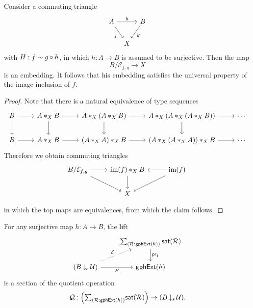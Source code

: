 \begin{thm}
Consider a commuting triangle
\begin{equation*}
\begin{tikzcd}[column sep=tiny]
A \arrow[rr,"h"] \arrow[dr,swap,"f"] & & B \arrow[dl,"g"] \\
& X
\end{tikzcd}
\end{equation*}
with $H:f\sim g\circ h$, in which $h:A\to B$ is assumed to be surjective. Then the map
\begin{equation*}
B/\mathcal{E}_{f,g} \to X
\end{equation*}
is an embedding. It follows that his embedding satisfies the universal property of the image inclusion of $f$. 
\end{thm}

\begin{proof}
Note that there is a natural equivalence of type sequences
\begin{equation*}
\begin{tikzcd}
B \arrow[d] \arrow[r] & \join[X]{A}{B} \arrow[d] \arrow[r] & \join[X]{A}{(\join[X]{A}{B})} \arrow[d] \arrow[r] & \join[X]{A}{(\join[X]{A}{(\join[X]{A}{B})})} \arrow[r] \arrow[d] & \cdots \\
B \arrow[r] & \join[X]{A}{B} \arrow[r] & \join[X]{(\join[X]{A}{A})}{B} \arrow[r] & \join[X]{(\join[X]{A}{(\join[X]{A}{A})})}{B} \arrow[r] & \cdots
\end{tikzcd}
\end{equation*}
Therefore we obtain commuting triangles
\begin{equation*}
\begin{tikzcd}
B/\mathcal{E}_{f,g} \arrow[r] \arrow[dr] & \join[X]{\im(f)}{B} \arrow[d] & \im(f) \arrow[dl] \arrow[l] \\
& X & \phantom{B/\mathcal{E}_{f,g}}
\end{tikzcd}
\end{equation*}
in which the top maps are equivalences, from which the claim follows.
\end{proof}

\begin{prp}
For any surjective map $h:A\to B$, the lift
\begin{equation*}
\begin{tikzcd}
& \sm{\mathcal{R}:\mathsf{gphExt}(h)}\mathsf{sat}(\mathcal{R}) \arrow[d,"\proj 1"] \\
(B\,{\downarrow_s}\,\UU) \arrow[r,swap,"E"] \arrow[ur,densely dotted,"\mathcal{E}"] & \mathsf{gphExt}(h)
\end{tikzcd}
\end{equation*}
is a section of the quotient operation
\begin{equation*}
\mathcal{Q} : \Big(\sm{\mathcal{R}:\mathsf{gphExt}(h)}\mathsf{sat}(\mathcal{R})\Big)\to (B\,{\downarrow_s}\,\UU).
\end{equation*}
\end{prp}

